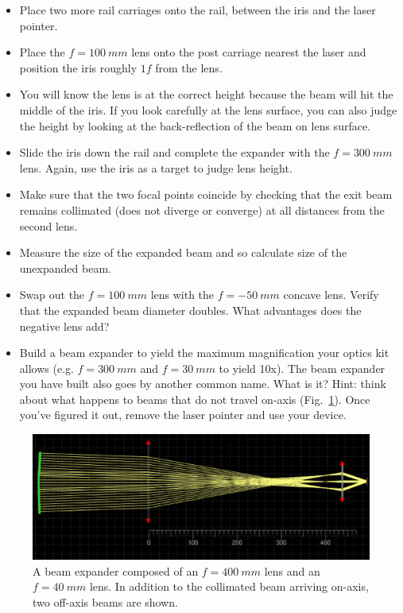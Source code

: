 \documentclass[a4paper]{report}
\begin{document}
\begin{itemize}
\item Place two more rail carriages onto the rail, between the iris and the laser pointer. 
\item Place the $f=100~mm$ lens onto the post carriage nearest the laser and position the iris roughly $1f$ from the lens.
\item You will know the lens is at the correct height because the beam will hit the middle of the iris. 
If you look carefully at the lens surface, you can also judge the height by looking at the back-reflection of the beam on lens surface. 
\item Slide the iris down the rail and complete the expander with the $f=300~mm$ lens. Again, use the iris as a target to judge lens height.
\item Make sure that the two focal points coincide by checking that the exit beam remains collimated (does not diverge or converge)
at all distances from the second lens. 
\item Measure the size of the expanded beam and so calculate size of the unexpanded beam.
\item Swap out the $f=100~mm$ lens with the $f=-50~mm$ concave lens. Verify that the expanded beam diameter doubles. 
What advantages does the negative lens add?
\item Build a beam expander to yield the maximum magnification your optics kit allows (e.g. $f=300~mm$ and $f=30~mm$ to yield 10x). 
The beam expander you have built also goes by another common name.  What is it? 
Hint: think about what happens to beams that do not travel on-axis (Fig.~\ref{fig:telescope}).
Once you've figured it out, remove the laser pointer and use your device. 
\end{itemize}


\begin{figure}[h]
\center
\includegraphics[width=4.5in]{telescope_ray_diag.eps}
\caption{A beam expander composed of an $f=400~mm$ lens and an $f=40~mm$ lens. 
In addition to the collimated beam arriving on-axis, two off-axis beams are shown.}
\label{fig:telescope}
\end{figure}
\end{document}
